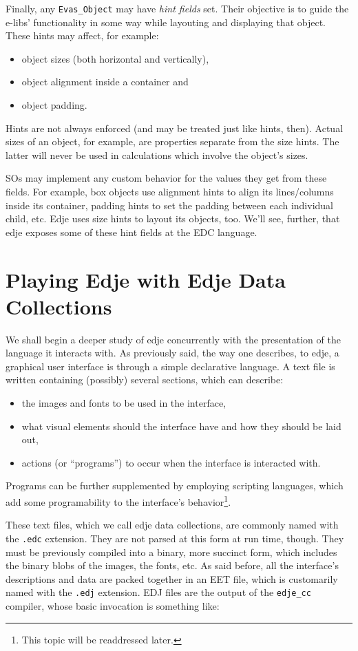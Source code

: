 \documentclass[a4paper]{profusion}
\begin{document}
Finally, any \texttt{Evas\_Object} may have \emph{hint fields}
set. Their objective is to guide the e-libs' functionality in some way
while layouting and displaying that object. These hints may affect,
for example:
\begin{itemize}
\item object sizes (both horizontal and vertically),
\item object alignment inside a container and
\item object padding.
\end{itemize}

Hints are not always enforced (and may be treated just like hints,
then). Actual sizes of an object, for example, are properties separate
from the size hints. The latter will never be used in calculations
which involve the object's sizes.

SOs may implement any custom behavior for the values they get from
these fields. For example, box objects use alignment hints to align
its lines/columns inside its container, padding hints to set the
padding between each individual child, etc. Edje uses size hints to
layout its objects, too. We'll see, further, that edje exposes some of
these hint fields at the EDC language.

\section{Playing Edje with Edje Data Collections}

We shall begin a deeper study of edje concurrently with the
presentation of the language it interacts with. As previously said,
the way one describes, to edje, a graphical user interface is through
a simple declarative language. A text file is written containing
(possibly) several sections, which can describe:
\begin{itemize}
\item the images and fonts to be used in the interface,
\item what visual elements should the interface have and how they
 should be laid out,
\item actions (or ``programs'') to occur when the interface is
 interacted with.
\end{itemize}
Programs can be further supplemented by employing scripting languages,
which   add  some   programability   to  the   interface's
behavior\footnote{This topic will be readdressed later.}.

These text files, which we call edje data collections, are commonly
named with the \texttt{.edc} extension. They are not parsed at this
form at run time, though. They must be previously compiled into a
binary, more succinct form, which includes the binary blobs of the
images, the fonts, etc.  As said before, all the interface's
descriptions and data are packed together in an EET file, which is
customarily named with the \texttt{.edj} extension. EDJ files are the
output of the \texttt{edje\_cc} compiler, whose basic invocation is
something like:
\end{document}
